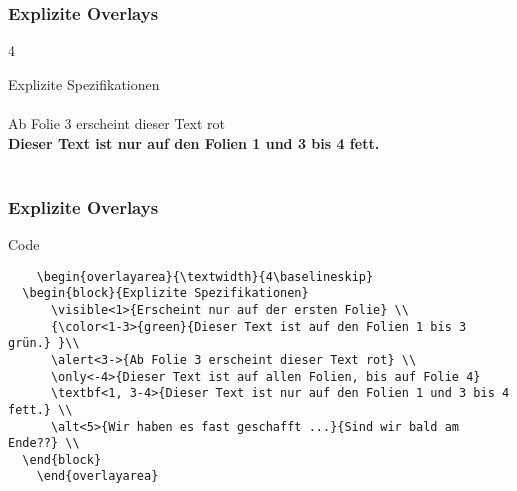 \begin{frame}[fragile]
  \frametitle{Explizite Overlays}

    \begin{overlayarea}{\textwidth}{4\baselineskip}
  \begin{block}{Explizite Spezifikationen}
       \\
      { }\\
      \alert<3->{Ab Folie 3 erscheint dieser Text rot} \\
      \textbf<1, 3-4>{Dieser Text ist nur auf den Folien 1 und 3 bis 4 fett.} \\
       \\
  \end{block}
    \end{overlayarea}
\end{frame}
\begin{frame}[fragile]
  \frametitle{Explizite Overlays}

  \begin{block}{Code}
    \begin{verbatim}
    \begin{overlayarea}{\textwidth}{4\baselineskip}
  \begin{block}{Explizite Spezifikationen}
      \visible<1>{Erscheint nur auf der ersten Folie} \\
      {\color<1-3>{green}{Dieser Text ist auf den Folien 1 bis 3 grün.} }\\
      \alert<3->{Ab Folie 3 erscheint dieser Text rot} \\
      \only<-4>{Dieser Text ist auf allen Folien, bis auf Folie 4} 
      \textbf<1, 3-4>{Dieser Text ist nur auf den Folien 1 und 3 bis 4 fett.} \\
      \alt<5>{Wir haben es fast geschafft ...}{Sind wir bald am Ende??} \\
  \end{block}
    \end{overlayarea}
    \end{verbatim}
  \end{block}
\end{frame}

